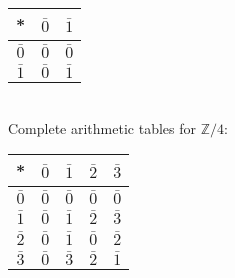 \documentclass[13pt]{article}
\begin{document}
	\begin{tabular}{|c || c | c|}
		\hline
		* &$ \bar{0} $&$ \bar{1}$\\
		\hline
		\hline
		$\bar{0} $&$ \bar{0} $&$ \bar{0} $\\
		\hline
		$\bar{1} $&$ \bar{0} $&$ \bar{1} $\\
		\hline
	\end{tabular}\\
	Complete arithmetic tables for $\mathbb{Z} / 4$:
	\begin{tabular}{|c || c | c | c | c |}
		\hline
		* &$ \bar{0} $&$ \bar{1} $&$ \bar{2} $&$ \bar{3}$\\
		\hline
		\hline
		$\bar{0} $&$ \bar{0} $&$ \bar{0} $&$ \bar{0} $&$ \bar{0} $\\
		\hline
		$\bar{1} $&$ \bar{0} $&$ \bar{1} $&$ \bar{2} $&$ \bar{3} $\\
		\hline
		$\bar{2} $&$ \bar{0} $&$ \bar{1} $&$ \bar{0} $&$ \bar{2} $\\
		\hline
		$\bar{3} $&$ \bar{0} $&$ \bar{3} $&$ \bar{2} $&$ \bar{1} $\\
		\hline
	\end{tabular}
\end{document}
